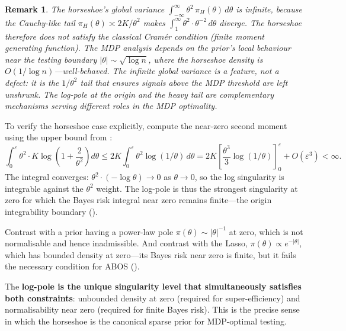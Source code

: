 \documentclass[12pt]{article}
\newtheorem{remark}{Remark}[section]
\newcommand{\abs}[1]{\lvert #1 \rvert}
\newcommand{\piH}{\pi_H}
\begin{document}
\begin{remark}\label{rem:global-variance}
The horseshoe's \emph{global} variance $\int_{-\infty}^\infty \theta^2\,\piH(\theta)\, d\theta$ is infinite, because the Cauchy-like tail $\piH(\theta) \asymp 2K/\theta^2$ makes $\int_1^\infty \theta^2 \cdot \theta^{-2}\, d\theta$ diverge. The horseshoe therefore does not satisfy the classical Cram\'er condition (finite moment generating function). The MDP analysis depends on the prior's \emph{local} behaviour near the testing boundary $\abs{\theta} \sim \sqrt{\log n}$, where the horseshoe density is $O(1/\log n)$---well-behaved. The infinite global variance is a feature, not a defect: it is the $1/\theta^2$ tail that ensures signals above the MDP threshold are left unshrunk. The log-pole at the origin and the heavy tail are complementary mechanisms serving different roles in the MDP optimality.
\end{remark}

To verify the horseshoe case explicitly, compute the near-zero second moment using the upper bound from :
\begin{equation}\label{eq:variance-integral}
  \int_0^\varepsilon \theta^2 \cdot K\log\!\left(1 + \frac{2}{\theta^2}\right) d\theta
  \leq 2K\int_0^\varepsilon \theta^2 \log(1/\theta)\, d\theta
  = 2K\!\left[\frac{\theta^3}{3}\log(1/\theta)\right]_0^\varepsilon + O(\varepsilon^3)
  < \infty.
\end{equation}
The integral converges: $\theta^2 \cdot (-\log\theta) \to 0$ as $\theta \to 0$, so the log singularity is integrable against the $\theta^2$ weight. The log-pole is thus the strongest singularity at zero for which the Bayes risk integral near zero remains finite---the origin integrability boundary ().

Contrast with a prior having a power-law pole $\pi(\theta) \sim \abs{\theta}^{-1}$ at zero, which is not normalisable and hence inadmissible. And contrast with the Lasso, $\pi(\theta) \propto e^{-\abs{\theta}}$, which has bounded density at zero---its Bayes risk near zero is finite, but it fails the necessary condition for ABOS ().

The \textbf{log-pole is the unique singularity level that simultaneously satisfies both constraints}: unbounded density at zero (required for super-efficiency) and normalisability near zero (required for finite Bayes risk). This is the precise sense in which the horseshoe is the canonical sparse prior for MDP-optimal testing.
\end{document}
